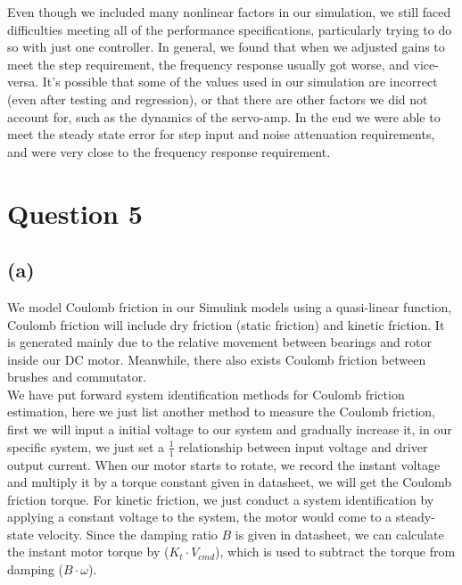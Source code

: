 \documentclass[letterpaper]{article}
\begin{document}
Even though we included many nonlinear factors in our simulation, we still faced difficulties meeting all of the performance specifications, particularly trying to do so with just one controller. In general, we found that when we adjusted gains to meet the step requirement, the frequency response usually got worse, and vice-versa. It's possible that some of the values used in our simulation are incorrect (even after testing and regression), or that there are other factors we did not account for, such as the dynamics of the servo-amp. In the end we were able to meet the steady state error for step input and noise attenuation requirements, and were very close to the frequency response requirement.\\

\clearpage

\section*{Question 5}
\subsection*{(a)}
We model Coulomb friction in our Simulink models using a quasi-linear function, Coulomb friction will include dry friction (static friction) and kinetic friction. It is generated mainly due to the relative movement between bearings and rotor inside our DC motor. Meanwhile, there also exists Coulomb friction between brushes and commutator.\\

We have put forward system identification methods for Coulomb friction estimation, here we just list another method to measure the Coulomb friction, first we will input a initial voltage to our system and gradually increase it, in our specific system, we just set a $\tfrac{1}{1}$ relationship between input voltage and driver output current. When our motor starts to rotate, we record the instant voltage and multiply it by a torque constant given in datasheet, we will get the Coulomb friction torque. For kinetic friction, we just conduct a system identification by applying a constant voltage to the system, the motor would come to a steady-state velocity. Since the damping ratio $B$ is given in datasheet, we can calculate the instant motor torque by ($K_{t} \cdot V_{cmd}$), which is used to subtract the torque from damping ($B\cdot\omega$).\\
\end{document}
